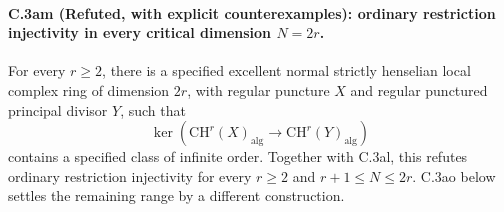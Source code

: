 \paragraph{C.3am (Refuted, with explicit counterexamples): ordinary restriction injectivity in every critical dimension $N=2r$.}
For every $r\ge2$, there is a specified excellent normal
strictly henselian local complex ring of dimension $2r$,
with regular puncture $X$ and regular punctured principal
divisor $Y$, such that
\[
 \ker\!\left(\mathrm{CH}^r(X)_{\mathrm{alg}}
       \longrightarrow\mathrm{CH}^r(Y)_{\mathrm{alg}}\right)
\]
contains a specified class of infinite order. Together with
C.3al, this refutes ordinary restriction injectivity for
every $r\ge2$ and $r+1\le N\le2r$. C.3ao below settles
the remaining range by a different construction.

